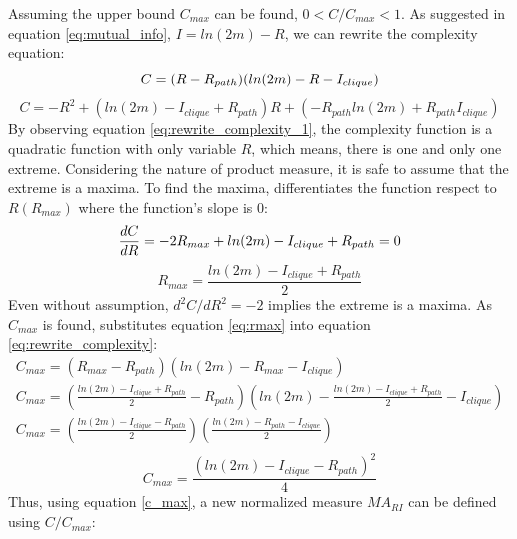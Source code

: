 \documentclass[12pt]{article}
\begin{document}
{Assuming the upper bound $C_{max}$ can be found, $0<C/C_{max}<1$. As suggested in equation \ref{eq:mutual_info}, $I = ln(2m)-R$, we can rewrite the complexity equation:\\
\begin{equation}
    \label{eq:rewrite_complexity}
     C = (R-R_{path})(ln(2m)-R-I_{clique})\\
\end{equation}
\begin{equation}
    \label{eq:rewrite_complexity_1}
    C = -R^2+(ln(2m)-I_{clique}+R_{path})R+(-R_{path}ln(2m)+R_{path}I_{clique})
\end{equation}
By observing equation \ref{eq:rewrite_complexity_1}, the complexity function is a quadratic function with only variable $R$, which means, there is one and only one extreme. Considering the nature of product measure, it is safe to assume that the extreme is a maxima. To find the maxima, differentiates the function respect to $R(R_{max})$ where the function's slope is 0:
\begin{equation}
    \label{eq:mari_diff}
        \frac{dC}{dR} = -2R_{max}+ln(2m)-I_{clique}+R_{path} = 0\\
\end{equation}
\begin{equation}
    \label{eq:rmax}
    R_{max} = \frac{ln(2m)-I_{clique}+R_{path}}{2}
\end{equation}
\noindent
Even without assumption, $d^2C/dR^2 = -2$ implies the extreme is a maxima. As $C_{max}$ is found, substitutes equation \ref{eq:rmax} into equation \ref{eq:rewrite_complexity}:\\
\begin{equation}
    \begin{gathered}
        C_{max} =(R_{max}-R_{path})(ln(2m)-R_{max}-I_{clique})\\
        C_{max} = (\frac{ln(2m)-I_{clique}+R_{path}}{2}-R_{path})(ln(2m)-\frac{ln(2m)-I_{clique}+R_{path}}{2}-I_{clique})\\
        C_{max} = (\frac{ln(2m)-I_{clique}-R_{path}}{2})(\frac{ln(2m)-R_{path}-I_{clique}}{2})\\
    \end{gathered}
\end{equation}
\begin{equation}
    \label{c_max}
    C_{max} = \frac{(ln(2m)-I_{clique}-R_{path})^2}{4}
\end{equation}
\noindent
Thus, using equation \ref{c_max}, a new normalized measure $MA_{RI}$ can be defined using $C/C_{max}$:\\
}
\end{document}
